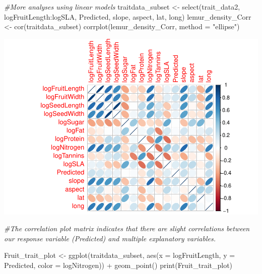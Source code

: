 \documentclass[
  12pt,
]{article}
\newenvironment{Shaded}{\begin{snugshade}}{\end{snugshade}}
\newcommand{\AttributeTok}[1]{\textcolor[rgb]{0.77,0.63,0.00}{#1}}
\newcommand{\CommentTok}[1]{\textcolor[rgb]{0.56,0.35,0.01}{\textit{#1}}}
\newcommand{\FunctionTok}[1]{\textcolor[rgb]{0.00,0.00,0.00}{#1}}
\newcommand{\NormalTok}[1]{#1}
\newcommand{\OtherTok}[1]{\textcolor[rgb]{0.56,0.35,0.01}{#1}}
\newcommand{\SpecialCharTok}[1]{\textcolor[rgb]{0.00,0.00,0.00}{#1}}
\newcommand{\StringTok}[1]{\textcolor[rgb]{0.31,0.60,0.02}{#1}}
\begin{document}
\begin{Shaded}
\begin{Highlighting}[]
\CommentTok{\#More analyses using linear models}
\NormalTok{traitdata\_subset }\OtherTok{\textless{}{-}} \FunctionTok{select}\NormalTok{(trait\_data2, logFruitLength}\SpecialCharTok{:}\NormalTok{logSLA, Predicted, slope, aspect, lat, long)}
\NormalTok{lemur\_density\_Corr }\OtherTok{\textless{}{-}} \FunctionTok{cor}\NormalTok{(traitdata\_subset)}
\FunctionTok{corrplot}\NormalTok{(lemur\_density\_Corr, }\AttributeTok{method =} \StringTok{"ellipse"}\NormalTok{)}
\end{Highlighting}
\end{Shaded}

\includegraphics{project_draft_files/figure-latex/unnamed-chunk-5-1.pdf}

\begin{Shaded}
\begin{Highlighting}[]
\CommentTok{\#The correlation plot matrix indicates that there are slight correlations between our response variable (Predicted) and multiple explanatory variables.}


\NormalTok{Fruit\_trait\_plot }\OtherTok{\textless{}{-}} \FunctionTok{ggplot}\NormalTok{(traitdata\_subset, }\FunctionTok{aes}\NormalTok{(}\AttributeTok{x =}\NormalTok{ logFruitLength, }\AttributeTok{y =}\NormalTok{ Predicted, }\AttributeTok{color =}\NormalTok{ logNitrogen)) }\SpecialCharTok{+}
  \FunctionTok{geom\_point}\NormalTok{()}
\FunctionTok{print}\NormalTok{(Fruit\_trait\_plot)}
\end{Highlighting}
\end{Shaded}
\end{document}
